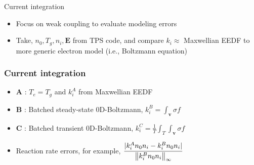 \documentclass[mathserif, aspectratio=169]{beamer}
\newcommand{\vect}[1]{\boldsymbol{#1}}
\newcommand{\norm}[1]{\left\lVert#1\right\rVert}
\begin{document}
\begin{frame}
\begin{columns}
\begin{column}{0.48\textwidth}
\begin{figure}
{}
			\end{figure}
		\end{column}
	\end{columns}
	Current integration
	\begin{itemize}
		\item Focus on weak coupling to evaluate modeling errors
		\item Take, $n_0, T_g, n_i, \vect{E}$ from TPS code, and compare $k_i\approx$ Maxwellian EEDF to more generic electron model (i.e., Boltzmann equation) 
	\end{itemize}
\end{frame}

\begin{frame}
	\frametitle{Current integration}
	\begin{itemize}
		\item \textbf{A} : $T_e=T_g$ and $k_i^{A}$ from Maxwellian EEDF %
		\item \textbf{B} : Batched steady-state 0D-Boltzmann, $k_i^{B} = \int_{\vect{v}} \sigma f $ 
		\item \textbf{C} : Batched transient 0D-Boltzmann, $k_i^{C} = \frac{1}{T} \int_{T} \int_{\vect{v}} \sigma f $ %
		\vspace{0.25in}
		\item Reaction rate errors, for example, $\cfrac{|k_i^{A} n_0 n_i  - k_i^{B} n_0 n_i|}{\norm{k_i^{B} n_0 n_i}_{\infty}}$ %
	\end{itemize}
\end{frame}
\end{document}
